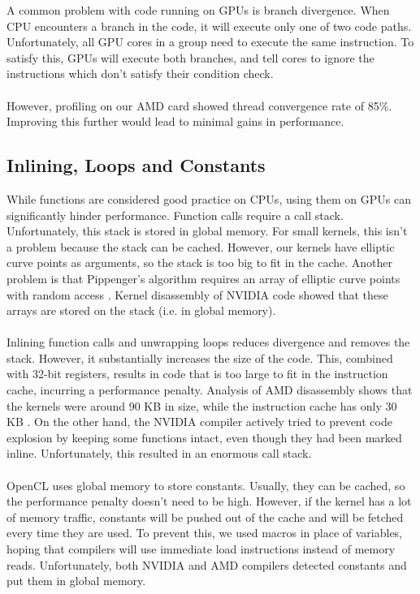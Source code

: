 A common problem with code running on GPUs is branch divergence. When CPU encounters a branch in the code, it will execute only one of two code paths. Unfortunately, all GPU cores in a group need to execute the same instruction. To satisfy this, GPUs will execute both branches, and tell cores to ignore the instructions which don't satisfy their condition check.\\
\\
However, profiling on our AMD card showed thread convergence rate of 85\%. Improving this further would lead to minimal gains in performance.

\subsection{Inlining, Loops and Constants}

While functions are considered good practice on CPUs, using them on GPUs can significantly hinder performance. Function calls require a call stack. Unfortunately, this stack is stored in global memory. For small kernels, this isn't a problem because the stack can be cached. However, our kernels have elliptic curve points as arguments, so the stack is too big to fit in the cache. Another problem is that Pippenger's algorithm requires an array of elliptic curve points with random access \cite{nvidiaarrayindexing}. Kernel disassembly of NVIDIA code showed that these arrays are stored on the stack (i.e. in global memory).\\
\\
Inlining function calls and unwrapping loops reduces divergence and removes the stack. However, it substantially increases the size of the code. This, combined with 32-bit registers, results in code that is too large to fit in the instruction cache, incurring a performance penalty. Analysis of AMD disassembly shows that the kernels were around 90 KB in size, while the instruction cache has only 30 KB \cite{amdgcnarch}. On the other hand, the NVIDIA compiler actively tried to prevent code explosion by keeping some functions intact, even though they had been marked inline. Unfortunately, this resulted in an enormous call stack.\\
\\
OpenCL uses global memory to store constants. Usually, they can be cached, so the performance penalty doesn't need to be high. However, if the kernel has a lot of memory traffic, constants will be pushed out of the cache and will be fetched every time they are used. To prevent this, we used macros in place of variables, hoping that compilers will use immediate load instructions instead of memory reads. Unfortunately, both NVIDIA and AMD compilers detected constants and put them in global memory.

